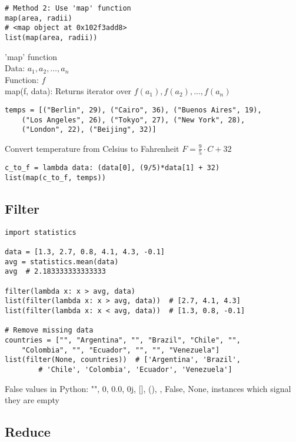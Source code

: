 \documentclass{beamer}
\begin{document}
\begin{frame}[fragile]
\begin{verbatim}
# Method 2: Use 'map' function
map(area, radii)
# <map object at 0x102f3add8>
list(map(area, radii))
\end{verbatim}
'map' function\\
Data: $a_1, a_2, \dots, a_n$\\
Function: $f$\\
map(f, data): Returns iterator over $f(a_1), f(a_2),...,f(a_n)$
\begin{verbatim}
temps = [("Berlin", 29), ("Cairo", 36), ("Buenos Aires", 19),
    ("Los Angeles", 26), ("Tokyo", 27), ("New York", 28), 
    ("London", 22), ("Beijing", 32)]
\end{verbatim}
Convert temperature from Celsius to Fahrenheit $F=\frac{9}{5}\cdot{C}+32$
\begin{verbatim}
c_to_f = lambda data: (data[0], (9/5)*data[1] + 32)
list(map(c_to_f, temps))
\end{verbatim}
\end{frame}

\subsection{Filter}

\begin{frame}[fragile]{}
\begin{verbatim}
import statistics

data = [1.3, 2.7, 0.8, 4.1, 4.3, -0.1]
avg = statistics.mean(data)
avg  # 2.183333333333333

filter(lambda x: x > avg, data)
list(filter(lambda x: x > avg, data))  # [2.7, 4.1, 4.3]
list(filter(lambda x: x < avg, data))  # [1.3, 0.8, -0.1]

# Remove missing data
countries = ["", "Argentina", "", "Brazil", "Chile", "",
    "Colombia", "", "Ecuador", "", "", "Venezuela"]
list(filter(None, countries))  # ['Argentina', 'Brazil', 
        # 'Chile', 'Colombia', 'Ecuador', 'Venezuela']
\end{verbatim}
\small{False values in Python:
"", 0, 0.0, 0j, [], (), {}, False, None, instances which signal
they are empty}
\end{frame}

\subsection{Reduce}
\end{document}

